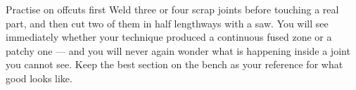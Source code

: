 
\begin{telospanel}{Practise on offcuts first}
Weld three or four scrap joints before touching a real part, and then cut two of
them in half lengthways with a saw. You will see immediately whether your
technique produced a continuous fused zone or a patchy one --- and you will never
again wonder what is happening inside a joint you cannot see. Keep the best
section on the bench as your reference for what good looks like.
\end{telospanel}


